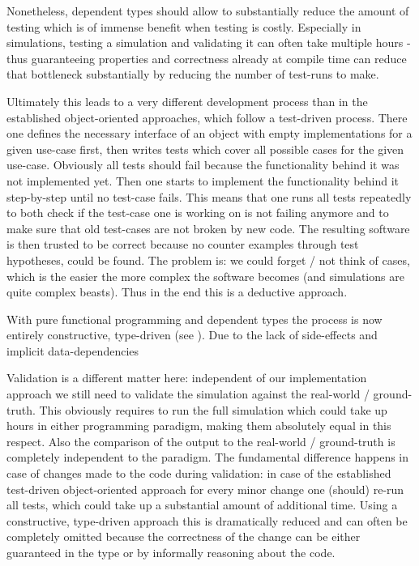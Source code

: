 Nonetheless, dependent types should allow to substantially reduce the amount of testing which is of immense benefit when testing is costly. Especially in simulations, testing a simulation and validating it can often take multiple hours - thus guaranteeing properties and correctness already at compile time can reduce that bottleneck substantially by reducing the number of test-runs to make.

Ultimately this leads to a very different development process than in the established object-oriented approaches, which follow a test-driven process. There one defines the necessary interface of an object with empty implementations for a given use-case first, then writes tests which cover all possible cases for the given use-case. Obviously all tests should fail because the functionality behind it was not implemented yet. Then one starts to implement the functionality behind it  step-by-step until no test-case fails. This means that one runs all tests repeatedly to both check if the test-case one is working on is not failing anymore and to make sure that old test-cases are not broken by new code. The resulting software is then trusted to be correct because no counter examples through test hypotheses, could be found. The problem is: we could forget / not think of cases, which is the easier the more complex the software becomes (and simulations are quite complex beasts). Thus in the end this is a deductive approach.

With pure functional programming and dependent types the process is now entirely constructive, type-driven (see \cite{brady_type-driven_2017}). Due to the lack of side-effects and implicit data-dependencies


Validation is a different matter here: independent of our implementation approach we still need to validate the simulation against the real-world / ground-truth. This obviously requires to run the full simulation which could take up hours in either programming paradigm, making them absolutely equal in this respect. Also the comparison of the output to the real-world / ground-truth is completely independent to the paradigm. The fundamental difference happens in case of changes made to the code during validation: in case of the established test-driven object-oriented approach for every minor change one (should) re-run all tests, which could take up a substantial amount of additional time. Using a constructive, type-driven approach this is dramatically reduced and can often be completely omitted because the correctness of the change can be either guaranteed in the type or by informally reasoning about the code.

